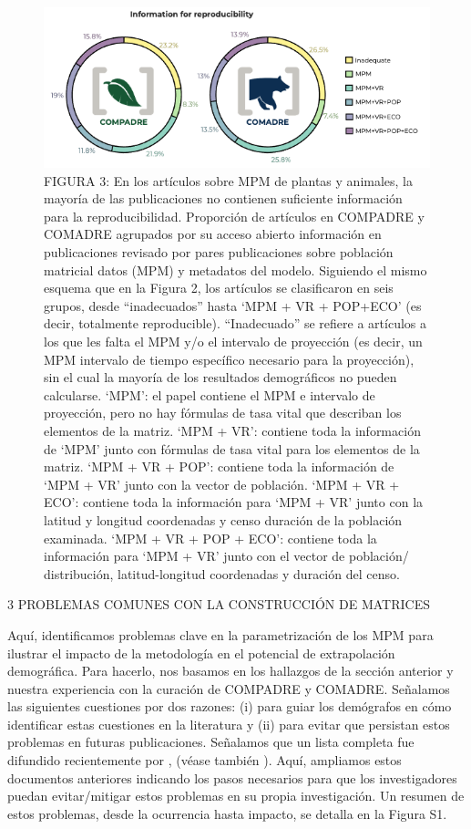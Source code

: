 \documentclass[
]{book}
\theoremstyle{definition}
\theoremstyle{definition}
\theoremstyle{definition}
\theoremstyle{definition}
\theoremstyle{remark}
\begin{document}
\begin{figure}
\centering
\includegraphics{Figures/COMPADRE_MADRE.png}
\caption{FIGURA 3: En los artículos sobre MPM de plantas y animales, la mayoría de las publicaciones no contienen suficiente información para la reproducibilidad. Proporción de artículos en COMPADRE y COMADRE agrupados por su acceso abierto información en publicaciones revisado por pares publicaciones sobre población matricial datos (MPM) y metadatos del modelo. Siguiendo el mismo esquema que en la Figura 2, los artículos se clasificaron en seis grupos, desde ``inadecuados'' hasta `MPM + VR + POP+ECO' (es decir, totalmente reproducible). ``Inadecuado'' se refiere a artículos a los que les falta el MPM y/o el intervalo de proyección (es decir, un MPM intervalo de tiempo específico necesario para la proyección), sin el cual la mayoría de los resultados demográficos no pueden calcularse. `MPM': el papel contiene el MPM e intervalo de proyección, pero no hay fórmulas de tasa vital que describan los elementos de la matriz. `MPM + VR': contiene toda la información de `MPM' junto con fórmulas de tasa vital para los elementos de la matriz. `MPM + VR + POP': contiene toda la información de `MPM + VR' junto con la vector de población. `MPM + VR + ECO': contiene toda la información para `MPM + VR' junto con la latitud y longitud coordenadas y censo duración de la población examinada. `MPM + VR + POP + ECO': contiene toda la información para `MPM + VR' junto con el vector de población/ distribución, latitud-longitud coordenadas y duración del censo.}
\end{figure}

3 \textbar{} PROBLEMAS COMUNES CON LA CONSTRUCCIÓN DE MATRICES

Aquí, identificamos problemas clave en la parametrización de los MPM para ilustrar el impacto de la metodología en el potencial de extrapolación demográfica. Para hacerlo, nos basamos en los hallazgos de la sección anterior y nuestra experiencia con la curación de COMPADRE y COMADRE. Señalamos las siguientes cuestiones por dos razones: (i) para guiar los demógrafos en cómo identificar estas cuestiones en la literatura y (ii) para evitar que persistan estos problemas en futuras publicaciones. Señalamos que un lista completa fue difundido recientemente por \citet{kendall2019persistent}, (véase también \citet{che2020comments}). Aquí, ampliamos estos documentos anteriores indicando los pasos necesarios para que los investigadores puedan evitar/mitigar estos problemas en su propia investigación. Un resumen de estos problemas, desde la ocurrencia hasta impacto, se detalla en la Figura S1.
\end{document}
